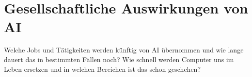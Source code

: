 \chapter{Gesellschaftliche Auswirkungen von \ac{AI}}

Welche Jobs und Tätigkeiten werden künftig von AI übernommen und wie lange dauert das in bestimmten Fällen noch? Wie schnell werden Computer uns im Leben ersetzen und in welchen Bereichen ist das schon geschehen?
